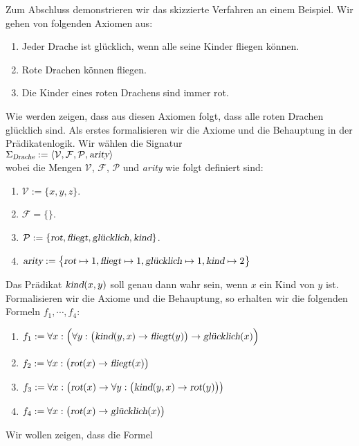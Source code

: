 \example
Zum Abschluss demonstrieren wir das skizzierte Verfahren an einem Beispiel.
Wir gehen von folgenden Axiomen aus:
\begin{enumerate}
\item Jeder Drache ist glücklich, wenn alle seine Kinder fliegen können.
\item Rote Drachen können fliegen.
\item Die Kinder eines roten Drachens sind immer rot.
\end{enumerate}
Wie werden zeigen, dass aus diesen Axiomen folgt, dass alle roten Drachen glücklich sind.
Als erstes formalisieren wir die Axiome und die Behauptung in der Prädikatenlogik.
Wir wählen die Signatur \\[0.2cm]
\hspace*{1.3cm}  $\Sigma_\textsl{Drache} := \langle \mathcal{V}, \mathcal{F}, \mathcal{P}, \textsl{arity} \rangle$ 
\\[0.2cm]
wobei die Mengen $\mathcal{V}$, $\mathcal{F}$, $\mathcal{P}$ und \textsl{arity} wie folgt definiert sind:
\begin{enumerate}
\item $\mathcal{V} := \{x,y,z\}$.
\item $\mathcal{F} = \{\}$.
\item $\mathcal{P} := \{ \textsl{rot}, \textsl{fliegt}, \textsl{glücklich}, \textsl{kind} \}$.
\item $\textsl{arity} := \bigl\{ \textsl{rot} \mapsto 1, \textsl{fliegt} \mapsto 1,
         \textsl{glücklich} \mapsto 1, \textsl{kind} \mapsto 2\bigr\}$
\end{enumerate}
Das Prädikat  $\textsl{kind}(x,y)$ soll genau dann wahr sein, wenn $x$ ein Kind von $y$ ist.
Formalisieren wir die Axiome und die Behauptung, so erhalten wir die folgenden
Formeln $f_1, \cdots, f_4$:
\begin{enumerate}
\item $f_1 := \forall x: \Bigl(\forall y: \big(\textsl{kind}(y,x) \rightarrow \textsl{fliegt}(y)\big) \rightarrow \textsl{glücklich}(x)\Bigr)$
\item $f_2 := \forall x: \bigl(\textsl{rot}(x) \rightarrow \textsl{fliegt}(x)\bigr)$
\item $f_3 := \forall x: \bigl(\textsl{rot}(x) \rightarrow \forall y:\bigl( \textsl{kind}(y,x) \rightarrow \textsl{rot}(y)\bigr)\bigr)$
\item $f_4 := \forall x: \bigl(\textsl{rot}(x) \rightarrow \textsl{glücklich}(x)\bigr)$
\end{enumerate}
Wir wollen zeigen, dass die Formel 
